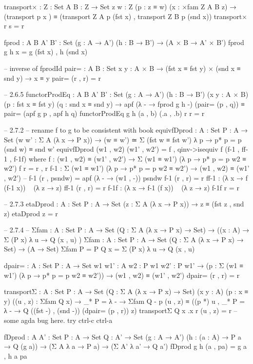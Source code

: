 \documentclass[11pt, a4paper]{article}
\begin{document}
\begin{code}
  transport× : {Z : Set} {A B : Z → Set} {z w : Z} (p : z ≡ w) (x : ×fam {Z} {A} {B} z) → (transport p x ) ≡ (transport {Z} {A} p (fst x) , transport {Z} {B} p (snd x))
  transport× r s = r

  fprod : {A B A' B' : Set} (g : A → A') (h : B → B') → (A × B → A' × B')
  fprod g h x = g (fst x) , h (snd x)

  -- inverse of fprodId
  pair= : {A B : Set} {x y : A × B} → (fst x ≡ fst y) × (snd x ≡ snd y) → x ≡ y
  pair= (r , r) = r

  -- 2.6.5
  functorProdEq : {A B A' B' : Set} (g : A → A') (h : B → B')  (x y : A × B) (p : fst x ≡ fst y) (q : snd x ≡ snd y) →  apf (λ - → fprod g h -) (pair= (p , q)) ≡ pair= (apf g p , apf h q)
  functorProdEq g h (a , b) (.a , .b) r r = r


  -- 2.7.2
  -- rename f to g to be consistent with book
  equivfDprod : {A : Set} {P : A → Set} (w w' : Σ A (λ x → P x)) → (w ≡ w') ≃ Σ (fst w ≡ fst w') λ p → p* {p = p} (snd w) ≡ snd w'
  equivfDprod (w1 , w2) (w1' , w2') = f , qinv->isequiv f (f-1 , ff-1 , f-1f)
    where
      f : (w1 , w2) ≡ (w1' , w2') → Σ (w1 ≡ w1') (λ p → p* {p = p} w2 ≡ w2')
      f r = r , r
      f-1 : Σ (w1 ≡ w1') (λ p → p* {p = p} w2 ≡ w2') → (w1 , w2) ≡ (w1' , w2')
      -- f-1 (r , psndw) = apf (λ - → (w1 , -)) psndw
      f-1 (r , r) = r
      ff-1 : (λ x → f (f-1 x)) ~ (λ z → z)
      ff-1 (r , r) = r
      f-1f : (λ x → f-1 (f x)) ~ (λ z → z)
      f-1f r = r

  -- 2.7.3
  etaDprod : {A : Set} {P : A → Set} (z : Σ A (λ x → P x)) → z ≡ (fst z , snd z)
  etaDprod z = r

  -- 2.7.4
  -- Σfam : {A : Set} {P : A → Set} (Q : Σ A (λ x → P x) → Set) → ((x : A) → Σ (P x) λ u → Q (x , u) )
  Σfam : {A : Set} {P : A → Set} (Q : Σ A (λ x → P x) → Set) → (A → Set)
  Σfam {P = P} Q x = Σ (P x) λ u → Q (x , u) 

  dpair= : {A : Set} {P : A → Set} {w1 w1' : A} {w2 : P w1 } {w2' : P w1'} →  (p : Σ (w1 ≡ w1') (λ p → p* {p = p} w2 ≡ w2')) → (w1 , w2) ≡ (w1' , w2')
  dpair= (r  , r) = r

  transportΣ : {A : Set} {P : A → Set} (Q : Σ A (λ x → P x) → Set) (x y : A) (p : x ≡ y) ((u , z) : Σfam Q x)
               →  _* {P = λ - → Σfam Q - } p (u , z) ≡ ((p *) u  , _* {P = λ - → Q ((fst -) , (snd -))} (dpair= (p , r)) z)
  transportΣ Q x .x r (u , z) = r -- some agda bug here.  try ctrl-c ctrl-a

  fDprod : {A A' : Set} {P : A → Set} {Q : A' → Set} (g : A → A') (h : (a : A) →  P a → Q (g a)) → (Σ A λ a → P a) → (Σ A' λ a' → Q a')
  fDprod g h (a , pa) = g a , h a pa


\end{code}
\end{document}
